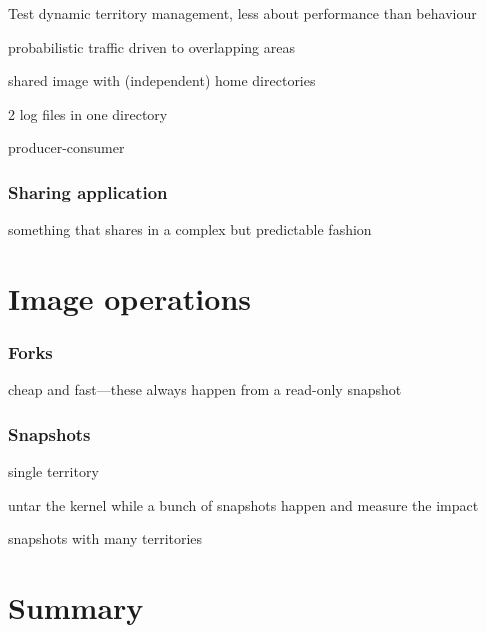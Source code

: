 Test dynamic territory management, less about performance than behaviour

probabilistic traffic driven to overlapping areas

shared image with (independent) home directories

2 log files in one directory

producer-consumer

\subsubsection{Sharing application}
something that shares in a complex but predictable fashion

\section{Image operations}

\subsubsection{Forks}

cheap and fast---these always happen from a read-only snapshot

\subsubsection{Snapshots}

single territory

untar the kernel while a bunch of snapshots happen and measure the impact

snapshots with many territories

\section{Summary}
